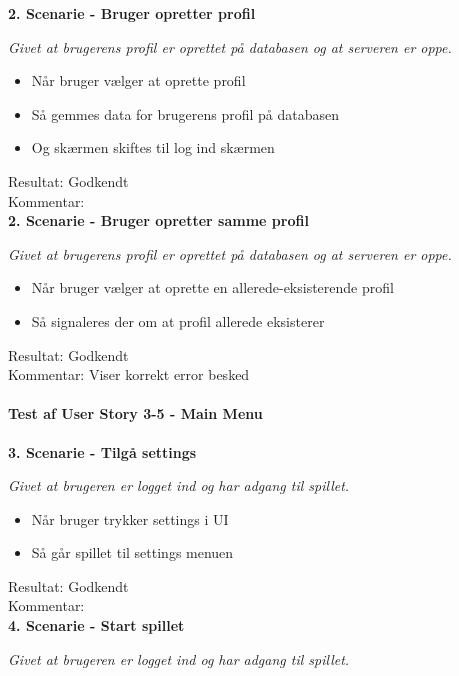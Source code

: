 \textbf{2. Scenarie - Bruger opretter profil}

\textit{Givet at brugerens profil er oprettet på databasen og at serveren er oppe.}

\begin{itemize}
  \item Når bruger vælger at oprette profil
  \item Så gemmes data for brugerens profil på databasen
  \item Og skærmen skiftes til log ind skærmen
\end{itemize}

Resultat: Godkendt\\
Kommentar:\\

\textbf{2. Scenarie - Bruger opretter samme profil}

\textit{Givet at brugerens profil er oprettet på databasen og at serveren er oppe.}

\begin{itemize}
  \item Når bruger vælger at oprette en allerede-eksisterende profil
  \item Så signaleres der om at profil allerede eksisterer
\end{itemize}

Resultat: Godkendt\\
Kommentar: Viser korrekt error besked\\

\paragraph{Test af User Story 3-5 - Main Menu}

\textbf{3. Scenarie - Tilgå settings}

\textit{Givet at brugeren er logget ind og har adgang til spillet.}

\begin{itemize}
  \item Når bruger trykker settings i UI
  \item Så går spillet til settings menuen
\end{itemize}

Resultat: Godkendt\\
Kommentar:\\

\textbf{4. Scenarie - Start spillet}

\textit{Givet at brugeren er logget ind og har adgang til spillet.}

